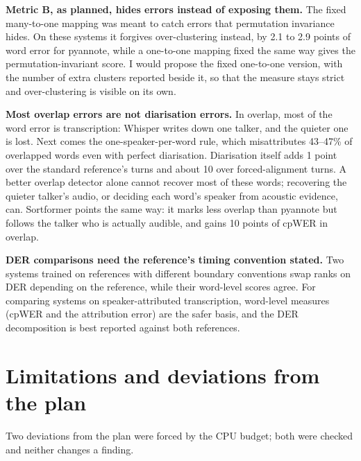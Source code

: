 \documentclass[11pt,a4paper]{article}
\begin{document}
\textbf{Metric B, as planned, hides errors instead of exposing them.} The fixed many-to-one mapping was meant to catch errors that permutation invariance hides. On these systems it forgives over-clustering instead, by 2.1 to 2.9 points of word error for pyannote, while a one-to-one mapping fixed the same way gives the permutation-invariant score. I would propose the fixed one-to-one version, with the number of extra clusters reported beside it, so that the measure stays strict and over-clustering is visible on its own.

\textbf{Most overlap errors are not diarisation errors.} In overlap, most of the word error is transcription: Whisper writes down one talker, and the quieter one is lost. Next comes the one-speaker-per-word rule, which misattributes 43--47\% of overlapped words even with perfect diarisation. Diarisation itself adds 1 point over the standard reference's turns and about 10 over forced-alignment turns. A better overlap detector alone cannot recover most of these words; recovering the quieter talker's audio, or deciding each word's speaker from acoustic evidence, can. Sortformer points the same way: it marks less overlap than pyannote but follows the talker who is actually audible, and gains 10 points of cpWER in overlap.

\textbf{DER comparisons need the reference's timing convention stated.} Two systems trained on references with different boundary conventions swap ranks on DER depending on the reference, while their word-level scores agree. For comparing systems on speaker-attributed transcription, word-level measures (cpWER and the attribution error) are the safer basis, and the DER decomposition is best reported against both references.

\section{Limitations and deviations from the plan}

Two deviations from the plan were forced by the CPU budget; both were checked and neither changes a finding.
\end{document}
